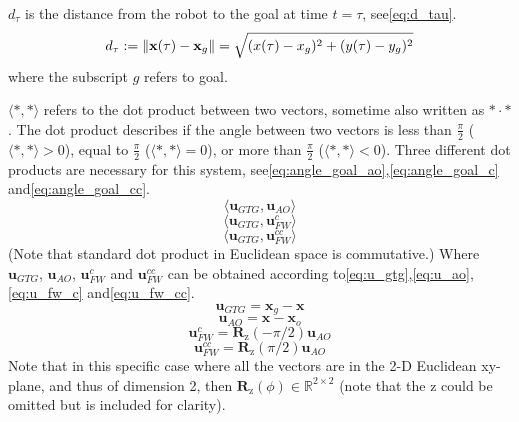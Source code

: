 $d_\tau$ is the distance from the robot to the goal at time $t = \tau$, see\:\eqref{eq:d_tau}.
\begin{equation}
    \label{eq:d_tau}
    d_\tau := \left\lVert \mathbf{x}(\tau) - \mathbf{x}_g \right\rVert = \sqrt{(x(\tau)-x_g)^2 + (y(\tau)-y_g)^2}
\end{equation}
where the subscript $g$ refers to goal.

$\langle *, * \rangle$ refers to the dot product between two vectors, sometime also written as $*\cdot*$. The dot product describes if the angle between two vectors is less than $\frac{\pi}{2}$ ($\langle *, * \rangle > 0$), equal to $\frac{\pi}{2}$ ($\langle *, * \rangle = 0$), or more than $\frac{\pi}{2}$ ($\langle *, * \rangle < 0$). Three different dot products are necessary for this system, see\:\eqref{eq:angle_goal_ao},\:\eqref{eq:angle_goal_c} and\:\eqref{eq:angle_goal_cc}\:\cite{carlenerikssonLectureKinematicsBehavioral2024}. 
\begin{dmath}
    \label{eq:angle_goal_ao}
    \langle \mathbf{u}_{GTG} , \mathbf{u}_{AO} \rangle
\end{dmath}
\begin{dmath}
    \label{eq:angle_goal_c}
    \langle \mathbf{u}_{GTG} , \mathbf{u}_{FW}^{c} \rangle
\end{dmath}
\begin{dmath}
    \label{eq:angle_goal_cc}
    \langle \mathbf{u}_{GTG} , \mathbf{u}_{FW}^{cc} \rangle
\end{dmath}
(Note that standard dot product in Euclidean space is commutative.)
Where $\mathbf{u}_{GTG}$, $\mathbf{u}_{AO}$, $\mathbf{u}_{FW}^{c}$ and $\mathbf{u}_{FW}^{cc}$ can be obtained according to\:\eqref{eq:u_gtg},\:\eqref{eq:u_ao},\:\eqref{eq:u_fw_c} and\:\eqref{eq:u_fw_cc}\:\cite{carlenerikssonLectureKinematicsBehavioral2024}.
\begin{dmath}
    \label{eq:u_gtg}
    \mathbf{u}_{GTG} = \mathbf{x}_g - \mathbf{x}
\end{dmath}
\begin{dmath}
    \label{eq:u_ao}
    \mathbf{u}_{AO} = \mathbf{x} - \mathbf{x}_o
\end{dmath}
\begin{dmath}
    \label{eq:u_fw_c}
    \mathbf{u}_{FW}^{c} = \mathbf{R}_{\text{z}}(-\pi/2) \mathbf{u}_{AO}
\end{dmath}
\begin{dmath}
    \label{eq:u_fw_cc}
    \mathbf{u}_{FW}^{cc} = \mathbf{R}_{\text{z}}(\pi/2) \mathbf{u}_{AO}
\end{dmath}
Note that in this specific case where all the vectors are in the 2-D Euclidean xy-plane, and thus of dimension 2, then $\mathbf{R}_{\text{z}}(\phi) \in \mathbb{R}^{2\times2}$ (note that the $\text{z}$ could be omitted but is included for clarity).

